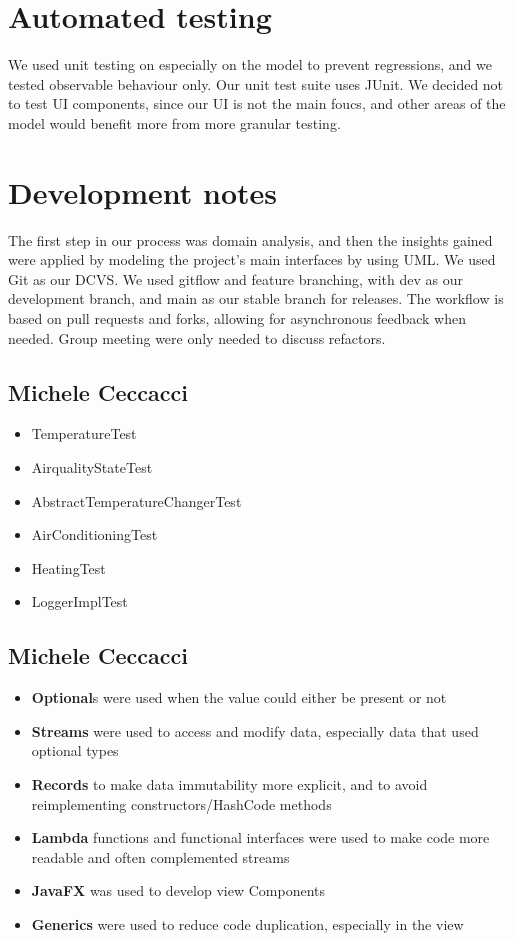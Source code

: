 \documentclass[a4paper,12pt]{report}
\begin{document}
\section{Automated testing}
We used unit testing on especially on the model to prevent regressions, and we tested observable behaviour only.
Our unit test suite uses JUnit.
We decided not to test UI components, since our UI is not the main foucs,
and other areas of the model would benefit more from more granular testing. 


\section{Development notes}
The first step in our process was domain analysis, and then the insights gained were applied by modeling 
the project's main interfaces by using UML. 
We used Git as our DCVS. We used gitflow and feature branching, with dev as our development branch,
and main as our stable branch for releases. The workflow is based on pull requests and forks, allowing for asynchronous feedback when needed.
Group meeting were only needed to discuss refactors. 

\subsection{Michele Ceccacci}
\begin{itemize}
	\item TemperatureTest
	\item AirqualityStateTest
	\item AbstractTemperatureChangerTest
	\item AirConditioningTest
	\item  HeatingTest
	\item LoggerImplTest
\end{itemize}

\subsection{Michele Ceccacci}
\begin{itemize}
	\item \textbf{Optional}s were used when the value could either be present or not
	\item \textbf{Streams} were used to access and modify data, especially data that used optional types
	\item \textbf{Records} to make data immutability more explicit, and to avoid reimplementing constructors/HashCode methods
	\item \textbf{Lambda} functions and functional interfaces were used to make code more readable and often complemented streams 
	\item \textbf{JavaFX} was used to develop view Components
	\item \textbf{Generics} were used to reduce code duplication, especially in the view
\end{itemize}
\end{document}
